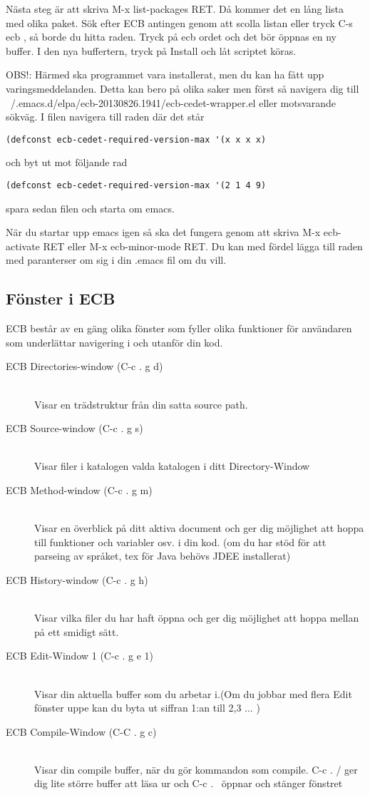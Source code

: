 \documentclass[12pt]{article} %
\begin{document}
Nästa steg är att skriva M-x list-packages RET. Då kommer det en lång lista med olika paket. Sök efter ECB antingen genom att scolla listan eller tryck C-s ecb , så borde du hitta raden. Tryck på ecb ordet och det bör öppnas en ny buffer. I den nya buffertern, tryck på Install och låt scriptet köras.


OBS!: Härmed ska programmet vara installerat, men du kan ha fått upp varingsmeddelanden. Detta kan bero på olika saker men först så navigera dig till ~/.emacs.d/elpa/ecb-20130826.1941/ecb-cedet-wrapper.el eller motsvarande sökväg. I filen navigera till raden där det står \begin{lstlisting}
(defconst ecb-cedet-required-version-max '(x x x x)
\end{lstlisting}
och byt ut mot följande rad
\begin{lstlisting}
(defconst ecb-cedet-required-version-max '(2 1 4 9)
\end{lstlisting}
spara sedan filen och starta om emacs.

När du startar upp emacs igen så ska det fungera genom att skriva M-x ecb-activate RET eller M-x ecb-minor-mode RET. Du kan med fördel lägga till raden med paranterser om sig i din .emacs fil om du vill.
\newpage
\subsection{Fönster i ECB}
ECB består av en gäng olika fönster som fyller olika funktioner för användaren som underlättar navigering i och utanför din kod.
\begin{description}
\item [ECB Directories-window (C-c . g d)] \hfill \\
  Visar en trädstruktur från din satta source path.
\item [ECB Source-window (C-c . g s)] \hfill \\
  Visar filer i katalogen valda katalogen i ditt Directory-Window
\item [ECB Method-window (C-c . g m)] \hfill \\
  Visar en överblick på ditt aktiva document och ger dig möjlighet att hoppa till funktioner och variabler osv. i din kod. (om du har stöd för att parseing av språket, tex för Java behövs JDEE installerat)  
\item [ECB History-window (C-c . g h)] \hfill \\
  Visar vilka filer du har haft öppna och ger dig möjlighet att hoppa mellan på ett smidigt sätt.
\item [ECB Edit-Window 1 (C-c . g e 1)] \hfill \\
  Visar din aktuella buffer som du arbetar i.(Om du jobbar med flera Edit fönster uppe kan du byta ut siffran 1:an till 2,3 ... )
\item [ECB Compile-Window (C-C . g c)] \hfill \\
  Visar din compile buffer, när du gör kommandon som compile. C-c . / ger dig lite större buffer att läsa ur och C-c . \ öppnar och stänger fönstret
\end{description}
\end{document}
